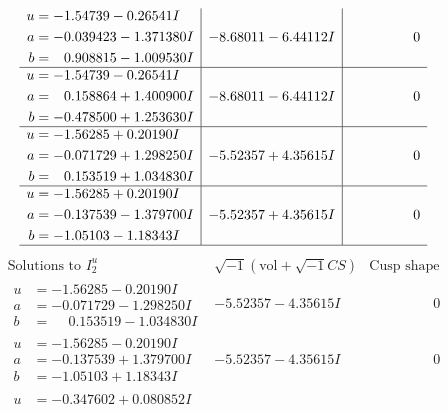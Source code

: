 \documentclass[1p]{elsarticle_modified}
\theoremstyle{definition}
\newcommand{\I}{\sqrt{-1}}
\begin{document}
$$\begin{array}{c|c|c}
\begin{aligned}
u &= -1.54739 - 0.26541 I \\
a &= -0.039423 - 1.371380 I \\
b &= \phantom{-}0.908815 - 1.009530 I\end{aligned}
 & -8.68011 - 6.44112 I & \phantom{-0.000000 } 0 \\ \hline\begin{aligned}
u &= -1.54739 - 0.26541 I \\
a &= \phantom{-}0.158864 + 1.400900 I \\
b &= -0.478500 + 1.253630 I\end{aligned}
 & -8.68011 - 6.44112 I & \phantom{-0.000000 } 0 \\ \hline\begin{aligned}
u &= -1.56285 + 0.20190 I \\
a &= -0.071729 + 1.298250 I \\
b &= \phantom{-}0.153519 + 1.034830 I\end{aligned}
 & -5.52357 + 4.35615 I & \phantom{-0.000000 } 0 \\ \hline\begin{aligned}
u &= -1.56285 + 0.20190 I \\
a &= -0.137539 - 1.379700 I \\
b &= -1.05103 - 1.18343 I\end{aligned}
 & -5.52357 + 4.35615 I & \phantom{-0.000000 } 0\\
 \hline 
 \end{array}$$\newpage$$\begin{array}{c|c|c}  
\text{Solutions to }I^u_{2}& \I (\text{vol} + \sqrt{-1}CS) & \text{Cusp shape}\\
 \hline 
\begin{aligned}
u &= -1.56285 - 0.20190 I \\
a &= -0.071729 - 1.298250 I \\
b &= \phantom{-}0.153519 - 1.034830 I\end{aligned}
 & -5.52357 - 4.35615 I & \phantom{-0.000000 } 0 \\ \hline\begin{aligned}
u &= -1.56285 - 0.20190 I \\
a &= -0.137539 + 1.379700 I \\
b &= -1.05103 + 1.18343 I\end{aligned}
 & -5.52357 - 4.35615 I & \phantom{-0.000000 } 0 \\ \hline\begin{aligned}
u &= -0.347602 + 0.080852 I \\

\end{aligned}
\end{array}$$
\end{document}
